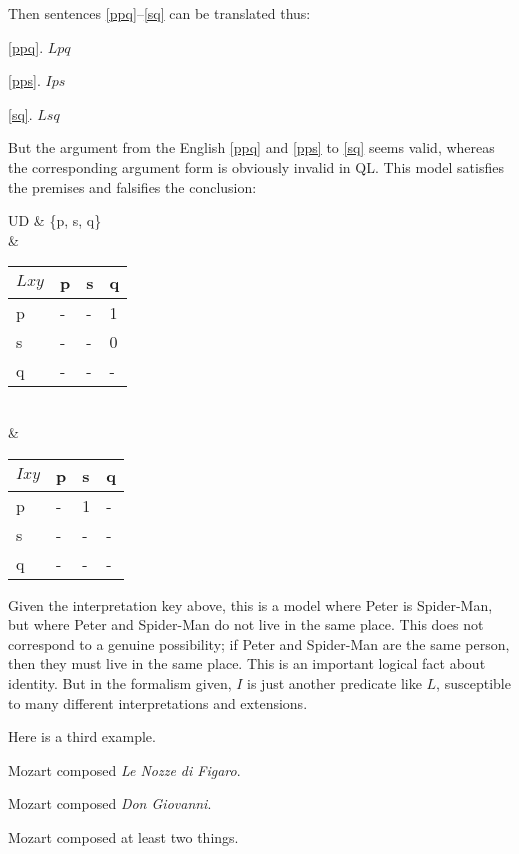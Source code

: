 Then sentences \ref{ppq}--\ref{sq} can be translated thus:

\begin{earg}
\item[\ref{ppq}.] $Lpq$
\item[\ref{pps}.] $Ips$
\item[\ref{sq}.] $Lsq$
\end{earg}

But the argument from the English \ref{ppq} and \ref{pps} to \ref{sq} seems valid, whereas the corresponding argument form is obviously invalid in QL. This model satisfies the premises and falsifies the conclusion:

\begin{partialmodel}
	UD & \{p, s, q\}\\
	 &\begin{tabular}{l|lll}
		$Lxy$   & p & s & q \\ \hline
		p & -     & -  & 1 \\
		s & -     & -  & 0 \\
		q & -     & -  & -
		\end{tabular}\\
	 &\begin{tabular}{l|lll}
		$Ixy$   & p & s & q \\ \hline
		p & -     & 1  & - \\
		s & -     & -  & - \\
		q & -     & -  & -
		\end{tabular}
\end{partialmodel}

Given the interpretation key above, this is a model where Peter is Spider-Man, but where Peter and Spider-Man do not live in the same place. This does not correspond to a genuine possibility; if Peter and Spider-Man are the same person, then they must live in the same place. This is an important logical fact about identity. But in the formalism given, $I$ is just another predicate like $L$, susceptible to many different interpretations and extensions.

Here is a third example. 

\begin{earg}
\item[\ex{m1}] Mozart composed \emph{Le Nozze di Figaro}.
\item[\ex{m2}] Mozart composed \emph{Don Giovanni}.
\item[\ex{m3}] Mozart composed at least two things.
\end{earg}

